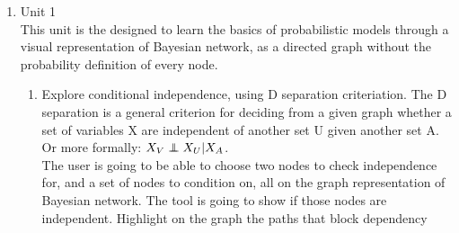\documentclass{article}
\newcommand\independent{\protect\mathpalette{\protect\independenT}{\perp}}
\def\independenT#1#2{\mathrel{\rlap{$#1#2$}\mkern2mu{#1#2}}}
\begin{document}
    \begin{enumerate}
        \item Unit 1\\
        This unit is the designed to learn the basics of probabilistic models through a visual representation of Bayesian network, as a directed graph without the probability definition of every node.
        \begin{enumerate}
            \item Explore conditional independence, using D separation criteriation. The D separation is a general criterion for deciding from a given graph whether a set of variables X are independent of another set U given another set A. Or more formally: $X_V \independent X_U | X_A$.\\
            The user is going to be able to choose two nodes to check independence for, and a set of nodes to condition on, all on the graph representation of Bayesian network. The tool is going to show if those nodes are independent. Highlight on the graph the paths that block dependency
        \end{enumerate}

        \vspace{0.5cm}


\end{enumerate}
\end{document}

